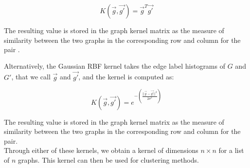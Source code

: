 $$K(\vec{g},\vec{g'}) = \vec{g}^{T}\vec{g'} $$

The resulting value is stored in the graph kernel matrix as the measure of similarity between the two graphs in the corresponding row and column for the pair \cite{sugiyama2015halting}.

Alternatively, the Gaussian RBF kernel takes the edge label histograms of $G$ and $G'$, that we call $\vec{g}$ and $\vec{g'}$, and the kernel is computed as:

$$K(\vec{g},\vec{g'}) = e^{-(\frac{||\vec{g}- \vec{g'}||^2}{2 \sigma^2})}$$

The resulting value is stored in the graph kernel matrix as the measure of similarity between the two graphs in the corresponding row and column for the pair.\\

Through either of these kernels, we obtain a kernel of dimensions $n \times n$ for a list of $n$ graphs. This kernel can then be used for clustering methods.



